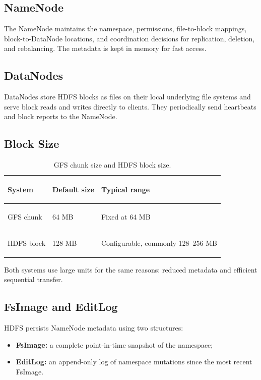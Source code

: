 \documentclass[11pt,a4paper,oneside]{book}
\begin{document}
\subsection{NameNode}

The NameNode maintains the namespace, permissions, file-to-block mappings, block-to-DataNode locations, and coordination decisions for replication, deletion, and rebalancing. The metadata is kept in memory for fast access.

\subsection{DataNodes}

DataNodes store HDFS blocks as files on their local underlying file systems and serve block reads and writes directly to clients. They periodically send heartbeats and block reports to the NameNode.

\subsection{Block Size}

\begin{table}[htbp]
\centering
\caption{GFS chunk size and HDFS block size.}
\label{tab:gfs-hdfs-size}
\begin{tabularx}{0.72\textwidth}{>{\bfseries\raggedright\arraybackslash}p{3.2cm} C{2.7cm} Y}
\toprule
{}
System & Default size & Typical range \\
\midrule
GFS chunk & 64 MB & Fixed at 64 MB \\
HDFS block & 128 MB & Configurable, commonly 128--256 MB \\
\bottomrule
\end{tabularx}
\end{table}

Both systems use large units for the same reasons: reduced metadata and efficient sequential transfer.

\subsection{FsImage and EditLog}

HDFS persists NameNode metadata using two structures:

\begin{itemize}
    \item \textbf{FsImage:} a complete point-in-time snapshot of the namespace;
    \item \textbf{EditLog:} an append-only log of namespace mutations since the most recent FsImage.
\end{itemize}
\end{document}
